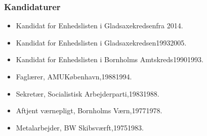 \documentclass[11pt, a4paper]{awesome-cv}
\begin{document}
\begin{cvletter}
\subsubsection*{Kandidaturer}
\begin{itemize}
\item Kandidat for Enhedslisten i Gladsaxekredsenfra 2014.
\item Kandidat for Enhedslisten i Gladsaxekredsen19932005.
\item Kandidat for Enhedslisten i Bornholms Amtskreds19901993.
\end{itemize}
\begin{itemize}
\item Faglærer, AMUKøbenhavn,19881994.
\item Sekretær, Socialistisk Arbejderparti,19831988.
\item Aftjent værnepligt, Bornholms Værn,19771978.
\item Metalarbejder, BW Skibsværft,19751983.
\end{itemize}
\end{cvletter}
\end{document}

